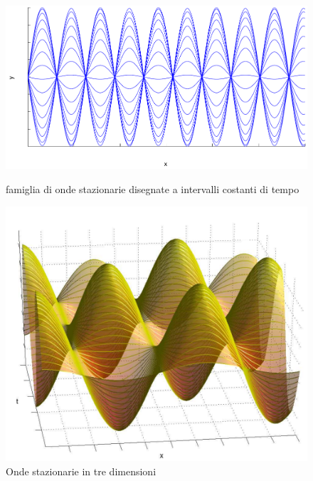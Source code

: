 \begin{figure}[htbp]
   \centering
   \includegraphics[scale=0.5]{immagini/fisica1/stazionarie1}
   \caption{famiglia di onde stazionarie disegnate a intervalli costanti di tempo}
   \includegraphics[scale=0.7]{immagini/fisica1/stazionarie2}
   \caption{Onde stazionarie in tre dimensioni}
\end{figure}

